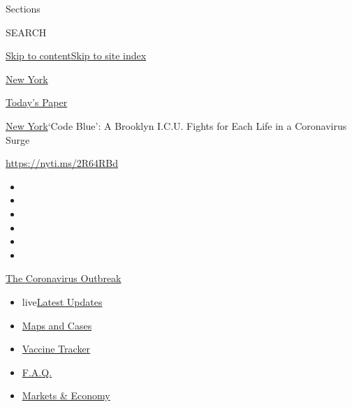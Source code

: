 Sections

SEARCH

\protect\hyperlink{site-content}{Skip to
content}\protect\hyperlink{site-index}{Skip to site index}

\href{https://www.nytimes.com/section/nyregion}{New York}

\href{https://myaccount.nytimes.com/auth/login?response_type=cookie\&client_id=vi}{}

\href{https://www.nytimes.com/section/todayspaper}{Today's Paper}

\href{/section/nyregion}{New York}\textbar{}`Code Blue': A Brooklyn
I.C.U. Fights for Each Life in a Coronavirus Surge

\href{https://nyti.ms/2R64RBd}{https://nyti.ms/2R64RBd}

\begin{itemize}
\item
\item
\item
\item
\item
\item
\end{itemize}

\href{https://www.nytimes.com/news-event/coronavirus?action=click\&pgtype=Article\&state=default\&region=TOP_BANNER\&context=storylines_menu}{The
Coronavirus Outbreak}

\begin{itemize}
\tightlist
\item
  live\href{https://www.nytimes.com/2020/08/08/world/coronavirus-updates.html?action=click\&pgtype=Article\&state=default\&region=TOP_BANNER\&context=storylines_menu}{Latest
  Updates}
\item
  \href{https://www.nytimes.com/interactive/2020/us/coronavirus-us-cases.html?action=click\&pgtype=Article\&state=default\&region=TOP_BANNER\&context=storylines_menu}{Maps
  and Cases}
\item
  \href{https://www.nytimes.com/interactive/2020/science/coronavirus-vaccine-tracker.html?action=click\&pgtype=Article\&state=default\&region=TOP_BANNER\&context=storylines_menu}{Vaccine
  Tracker}
\item
  \href{https://www.nytimes.com/interactive/2020/world/coronavirus-tips-advice.html?action=click\&pgtype=Article\&state=default\&region=TOP_BANNER\&context=storylines_menu}{F.A.Q.}
\item
  \href{https://www.nytimes.com/live/2020/08/07/business/stock-market-today-coronavirus?action=click\&pgtype=Article\&state=default\&region=TOP_BANNER\&context=storylines_menu}{Markets
  \& Economy}
\end{itemize}

